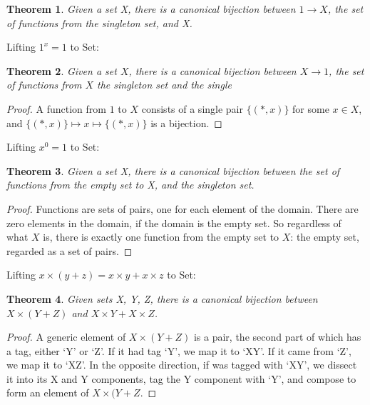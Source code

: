 \documentclass{proc-l}
\newtheorem{theorem}{Theorem}[section]
\theoremstyle{definition}
\theoremstyle{remark}
\numberwithin{equation}{section}
\begin{document}
\begin{theorem}
Given a set X, there is a canonical bijection between \(1 \to X\), the set of functions from the singleton set, and X.
\end{theorem}

Lifting \(1^x = 1\) to Set:

\begin{theorem}
Given a set \(X\), there is a canonical bijection between \(X \to 1\), the set of functions from \(X\) the singleton set
and the single

\end{theorem}

\begin{proof}
A function from \(1\) to \(X\) consists of a single pair \(\{(*, x)\}\) for some \(x \in X\), and \(\{(*, x)\} \mapsto x \mapsto \{(*, x)\}\) is a bijection.
\end{proof}

Lifting \(x^0 = 1\) to Set:

\begin{theorem}
Given a set X, there is a canonical bijection between the set of functions from the empty set to X, and the singleton set.
\end{theorem}

\begin{proof}
Functions are sets of pairs, one for each element of the domain. There are zero elements in the domain, if the domain is the empty set. So regardless of what \(X\) is, there is exactly one function from the empty set to \(X\): the empty set, regarded as a set of pairs.
\end{proof}

Lifting \(x \times (y + z) = x \times y + x \times z\) to Set:

\begin{theorem}
Given sets X, Y, Z, there is a canonical bijection between \(X \times (Y + Z)\) and \(X \times Y + X \times Z\).
\end{theorem}

\begin{proof}
A generic element of \(X \times (Y + Z)\) is a pair, the second part of which has a tag, either `Y' or `Z'. If it had tag `Y', we map it to `XY'. If it came from `Z', we map it to `XZ'. In the opposite direction, if was tagged with `XY', we dissect it into its X and Y components, tag the Y component with `Y', and compose to form an element of \(X \times (Y + Z\). 
\end{proof}
\end{document}
